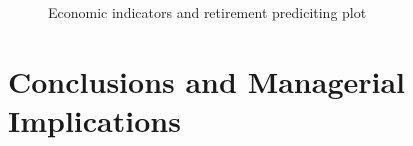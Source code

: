 \documentclass[12pt,letterpaper]{article}
\begin{document}
\begin{figure}[h!]
	\centering
	\caption{Economic indicators and retirement prediciting plot}
	\label{fig:EIndex}
\end{figure}

\section{Conclusions and Managerial Implications}




	
\end{document}
